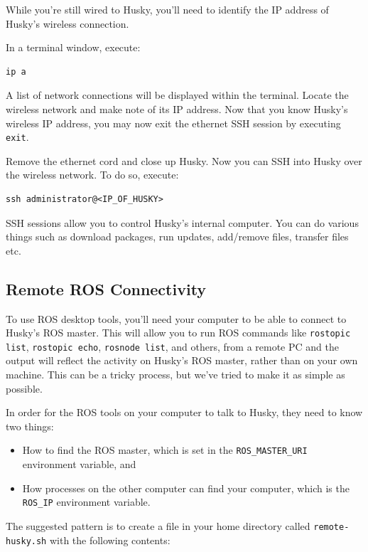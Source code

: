 \documentclass[]{clearpath-latex/clearpath-manual}
\begin{document}
While you're still wired to Husky, you'll need to identify the IP address of Husky's wireless connection.

In a terminal window, execute:

\begin{lstlisting}
ip a
\end{lstlisting}

A list of network connections will be displayed within the terminal. Locate the wireless network and make note of its IP address. Now that you know Husky's wireless IP address, you may now exit the ethernet SSH session by executing \lstinline{exit}.

Remove the ethernet cord and close up Husky.   Now you can SSH into Husky over the wireless network.  To do so, execute:

\begin{lstlisting}
ssh administrator@<IP_OF_HUSKY>
\end{lstlisting}

SSH sessions allow you to control Husky's internal computer.  You can do various things such as download packages, run updates, add/remove files, transfer files etc.

\subsection{Remote ROS Connectivity}\label{remote}

To use ROS desktop tools, you’ll need your computer to be able to connect to Husky’s ROS master. This will allow you to run ROS commands like \lstinline{rostopic list}, \lstinline{rostopic echo}, \lstinline{rosnode list}, and others, from a remote PC and the output will reflect the activity on Husky’s ROS master, rather than on your own machine.  This can be a tricky process, but we’ve tried to make it as simple as possible.

In order for the ROS tools on your computer to talk to Husky, they need to know two things:

\begin{itemize}[nolistsep]
  \item How to find the ROS master, which is set in the \lstinline{ROS_MASTER_URI} environment variable, and
  \item How processes on the other computer can find your computer, which is the \lstinline{ROS_IP} environment variable.
\end{itemize}

The suggested pattern is to create a file in your home directory called \lstinline{remote-husky.sh} with the following contents:
\end{document}
